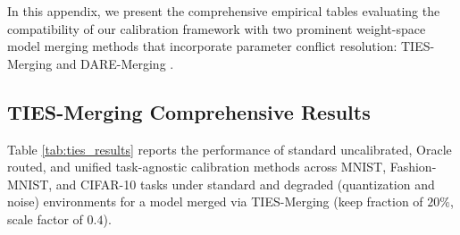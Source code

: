 \documentclass{article}
\theoremstyle{plain}
\theoremstyle{definition}
\theoremstyle{remark}
\begin{document}
In this appendix, we present the comprehensive empirical tables evaluating the compatibility of our calibration framework with two prominent weight-space model merging methods that incorporate parameter conflict resolution: TIES-Merging \cite{Yadav2023Ties} and DARE-Merging \cite{Yu2024Dare}.

\subsection{TIES-Merging Comprehensive Results}
Table \ref{tab:ties_results} reports the performance of standard uncalibrated, Oracle routed, and unified task-agnostic calibration methods across MNIST, Fashion-MNIST, and CIFAR-10 tasks under standard and degraded (quantization and noise) environments for a model merged via TIES-Merging (keep fraction of $20\%$, scale factor of $0.4$).
\end{document}
